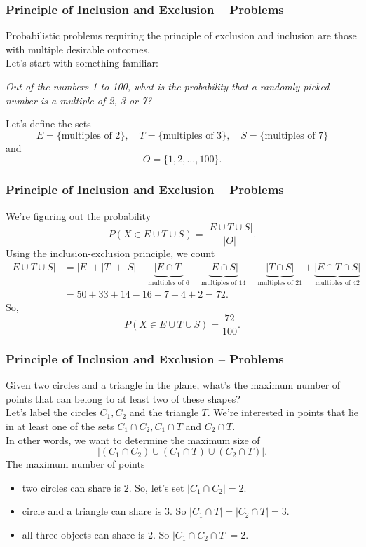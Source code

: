 \documentclass[aspectratio=169,11pt,usenames,dvipsnames]{beamer}
\begin{document}
\begin{frame}
 \frametitle{Principle of Inclusion and Exclusion -- Problems}
 Probabilistic problems requiring the \alert{principle of exclusion and
 inclusion} are those with multiple desirable outcomes.\pause\\
 Let's start with something familiar:
 \begin{center}
  \emph{Out of the numbers 1 to 100, what is the probability that a randomly
  picked number is a multiple of 2, 3 or 7?}
 \end{center}
 \pause
 Let's define the sets
 \[
  E = \{\text{multiples of 2}\}, \quad T = \{\text{multiples of 3}\}, \quad S =
  \{\text{multiples of 7}\}
 \]
 \pause
 and
 \[
  O = \{1,2,\ldots,100\}.
 \]
\end{frame}

\begin{frame}
 \frametitle{Principle of Inclusion and Exclusion -- Problems}
 We're figuring out the probability
 \[
  P(X \in E \cup T \cup S) = \frac{|E \cup T \cup S|}{|O|}.
 \]
 \pause
 Using the \alert{inclusion-exclusion principle}, we count
 \begin{align*}
  |E \cup T \cup S| &= |E| + |T| + |S| - \underbrace{|E \cap
  T|}_{\text{multiples of $6$}} - \underbrace{|E \cap S|}_{\text{multiples of
  $14$}} - \underbrace{|T \cap S|}_{\text{multiples of $21$}} + \underbrace{|E \cap T \cap
  S|}_{\text{multiples of $42$}} \\
                    &= 50 + 33 + 14 - 16 - 7 - 4 + 2 = 72.
 \end{align*}
 \pause
 So,
 \[
  P(X \in E \cup T \cup S) = \frac{72}{100}.
 \]
\end{frame}

\begin{frame}
 \frametitle{Principle of Inclusion and Exclusion -- Problems}
 Given two circles and a triangle in the plane, what's the maximum number of
 points that can belong to at least two of these shapes?\pause\\
 Let's label the circles $C_1,C_2$ and the triangle $T$. \pause
 We're interested in points that lie in \alert{at least one} of the sets $C_1
 \cap C_2, C_1 \cap T$ and $C_2 \cap T$.\pause\\
 In other words, we want to determine the maximum size of
 \[
  |(C_1 \cap C_2) \cup (C_1 \cap T) \cup (C_2 \cap T)|.
 \]
 \pause
 The maximum number of points
 \begin{itemize}
  \item two circles can share is $2$. So, let's set $|C_1 \cap C_2| = 2$.
  \pause
  \item circle and a triangle can share is $3$. So $|C_1 \cap T| = |C_2 \cap T|
   = 3$.
  \pause
  \item all three objects can share is $2$. So $|C_1 \cap C_2 \cap T| = 2$.
 \end{itemize}
\end{frame}
\end{document}
